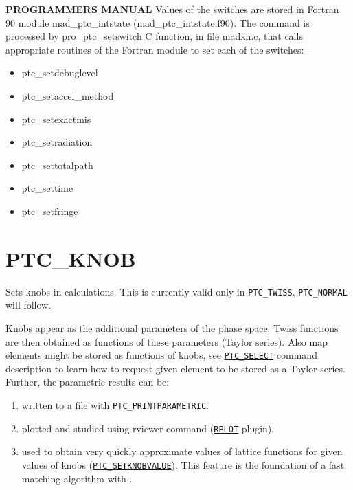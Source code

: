{\bf PROGRAMMERS MANUAL}   
Values of the switches are stored in Fortran 90 module
mad\_ptc\_intstate (mad\_ptc\_intstate.f90). The command is processed by
pro\_ptc\_setswitch C function, in file madxn.c, that calls appropriate
routines of the Fortran module to set each of the switches:   
\begin{itemize}
   \item  ptc\_setdebuglevel 
   \item  ptc\_setaccel\_method 
   \item  ptc\_setexactmis 
   \item  ptc\_setradiation 
   \item  ptc\_settotalpath 
   \item  ptc\_settime 
   \item  ptc\_setfringe  
\end{itemize}



%

\section{PTC\_KNOB}
\label{sec:ptc_knob}


Sets knobs in \ptc calculations. This is currently valid only in
{\tt  PTC\_TWISS}, {\tt PTC\_NORMAL} will follow. 

Knobs appear as the additional parameters of
the phase space. Twiss functions are then obtained  as functions of
these parameters (Taylor series).  Also map elements might be stored as
functions of knobs, see \hyperref[sec:ptc_select]{\tt PTC\_SELECT} command
description to learn how to request given element to be stored as a
Taylor series.  \\

Further, the parametric results can be: 
\begin{enumerate}
   \item  written to a file with
     \hyperref[ptc_printparametric]{\tt PTC\_PRINTPARAMETRIC}. 
   \item  plotted and studied using rviewer command
     (\hyperref[sec:rplot]{\tt RPLOT} plugin). 
   \item  used to obtain very quickly approximate values of lattice
     functions for given values of knobs
     (\hyperref[sec:ptc_setknobvalue]{\tt PTC\_SETKNOBVALUE}). This
     feature is the foundation of a fast matching algorithm with \ptc.      
\end{enumerate}


